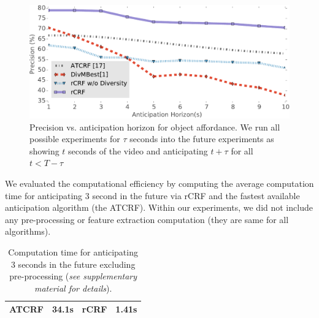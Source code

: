 \documentclass[conference]{IEEEtran}
\begin{document}
\begin{figure}[t]
  \centering
  \includegraphics[width=0.48 \textwidth]{AntO}
\caption{Precision vs. anticipation horizon for object affordance. We run all possible experiments for $\tau$ seconds into the future experiments as showing $t$ seconds of the video and anticipating $t+\tau$ for all $t<T-\tau$}
\label{antHor}
\end{figure}




We evaluated the computational efficiency by computing the average computation time for anticipating 3 second in the future via rCRF and the fastest available anticipation algorithm (the ATCRF\cite{hemaAnt}). Within our experiments, we did not include any pre-processing or feature extraction computation (they are same for all algorithms).
\begin{table}[h!]
  \centering
\caption{Computation time for anticipating 3 seconds in the future excluding pre-processing (\emph{see supplementary material for details}).}
  \begin{tabular}{|cc|cc|}
    \hline
  ATCRF \cite{hemaAnt} \; \; & \; \; 34.1s  \; \;  \; & \; \; \;  rCRF \; \; & \; \;  1.41s \\ \hline
  \end{tabular}
  \vspace{-1mm}
  \label{speed}
\end{table}
\end{document}
